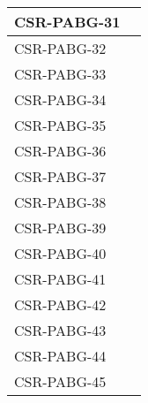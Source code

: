 \begin{longtable}{|p{1.5cm}|p{12cm}|@{}}
\hline
CSR-PABG-31&
\begin{minipage}{12cm}
\end{minipage}\\
\hline
CSR-PABG-32&
\begin{minipage}{12cm}
\end{minipage}\\
\hline
CSR-PABG-33&
\begin{minipage}{12cm}
\end{minipage}\\
\hline
CSR-PABG-34&
\begin{minipage}{12cm}
\end{minipage}\\
\hline
CSR-PABG-35&
\begin{minipage}{12cm}
\end{minipage}\\
\hline
CSR-PABG-36&
\begin{minipage}{12cm}
\end{minipage}\\
\hline
CSR-PABG-37&
\begin{minipage}{12cm}
\end{minipage}\\
\hline
CSR-PABG-38&
\begin{minipage}{12cm}
\end{minipage}\\
\hline
CSR-PABG-39&
\begin{minipage}{12cm}
\end{minipage}\\
\hline
CSR-PABG-40&
\begin{minipage}{12cm}
\end{minipage}\\
\hline
CSR-PABG-41&
\begin{minipage}{12cm}
\end{minipage}\\
\hline
CSR-PABG-42&
\begin{minipage}{12cm}
\end{minipage}\\
\hline
CSR-PABG-43&
\begin{minipage}{12cm}
\end{minipage}\\
\hline
CSR-PABG-44&
\begin{minipage}{12cm}
\end{minipage}\\
\hline
CSR-PABG-45&
\begin{minipage}{12cm}

\end{minipage}
\end{longtable}
